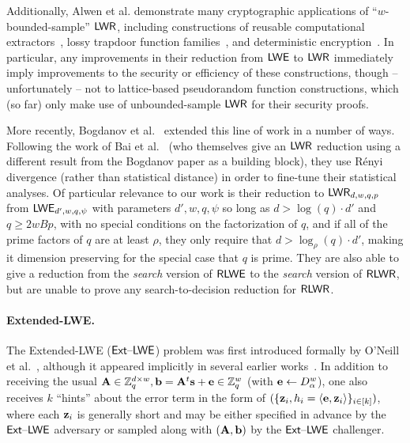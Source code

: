 \iflncs
\else
Additionally, Alwen et al. demonstrate many cryptographic applications
of ``$w$-bounded-sample'' $\mathsf{LWR}$, including constructions of reusable computational
extractors~\cite{DBLP:conf/stoc/DodisKL09}, lossy trapdoor function families~\cite{DBLP:journals/siamcomp/PeikertW11}, and deterministic encryption~\cite{DBLP:conf/crypto/BellareBO07,DBLP:conf/crypto/BellareFOR08,DBLP:conf/crypto/BoldyrevaFO08,DBLP:journals/joc/BrakerskiS14,DBLP:journals/joc/FullerOR15}.
In particular, any improvements in their reduction from $\mathsf{LWE}$ to $\mathsf{LWR}$ immediately imply improvements to the security or efficiency of these
constructions, though -- unfortunately -- not to lattice-based
pseudorandom function constructions, which (so far) only make use of
unbounded-sample $\mathsf{LWR}$ for their security proofs.
\fi

More recently, Bogdanov et al.~\cite{DBLP:conf/tcc/BogdanovGMRR16}
extended this line of work in a number of ways. Following the work of
Bai et al.~\cite{DBLP:conf/asiacrypt/BaiLLSS15} (who themselves give
an $\mathsf{LWR}$ reduction using a different result from the Bogdanov paper
as a building block), they use R\'{e}nyi
divergence (rather than statistical
distance)  in order to fine-tune their statistical analyses. Of
particular relevance to our work is their reduction to
$\mathsf{LWR}_{d,w,q,p}$ from $\mathsf{LWE}_{d',w,q,\psi}$ with parameters
$d', w, q, \psi$ so long as $d > \log(q)\cdot d'$ and $q\ge 2wBp$,
with no special conditions on the factorization of $q$, and if all of the prime factors of $q$ are at least $\rho$, they only
require that $d > \log_{\rho}(q) \cdot d'$, making it dimension
preserving for the special case that $q$ is prime. They are also able to give
a reduction from the \emph{search} version of $\mathsf{RLWE}$ to the
\emph{search} version of $\mathsf{RLWR}$, but are unable to prove any
search-to-decision reduction for $\mathsf{RLWR}$.

\paragraph{Extended-LWE.} The Extended-LWE ($\mathsf{Ext \text{\textendash} LWE}$) problem was first introduced formally by
O'Neill et al.~\cite{DBLP:conf/crypto/ONeillPW11}, although it
appeared implicitly in several earlier
works~\cite{DBLP:conf/tcc/DodisGKPV10,DBLP:conf/innovations/GoldwasserKPV10}. In
addition to receiving the usual $\mathbf{A} \in \mathbb{Z}_q^{d \times w},
\mathbf{b}=\mathbf{A}^t\mathbf{s}+\mathbf{e} \in \mathbb{Z}_q^w$ (with $\mathbf{e} \gets D_{\alpha}^w$), one
also receives $k$ ``hints'' about the error term in the form of
$(\{\mathbf{z}_i, h_i=\langle\mathbf{e},\mathbf{z}_i\rangle\}_{i \in [k]})$, where
each $\mathbf{z}_i$ is generally short and
may be either specified in advance by the $\mathsf{Ext \text{\textendash} LWE}$ adversary or
sampled along with $(\mathbf{A}, \mathbf{b})$ by the $\mathsf{Ext \text{\textendash} LWE}$ challenger. 

